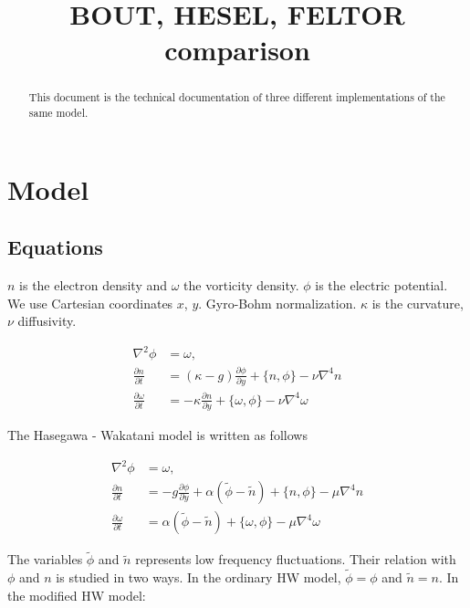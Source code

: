 \documentclass{hitec} %
\begin{document}
\title{BOUT, HESEL, FELTOR comparison}
\maketitle

\begin{abstract}
This document is the technical documentation of three different implementations of the same model.
\end{abstract}

\section{Model}
\subsection{Equations}
 $n$ is the electron density and $\omega$
the vorticity density. $\phi$ is the electric potential. We
use Cartesian coordinates $x$, $y$. Gyro-Bohm normalization. $\kappa$ is
the curvature, $\nu$ diffusivity.

\begin{subequations}
\begin{align}
 \nabla^2 \phi & =  \omega, \quad \\
 \frac{\partial n}{\partial t}    & =  (\kappa - g) \frac{\partial \phi}{\partial y} + \{ n, \phi\}
  - \nu \nabla^4 n  \\
  \frac{\partial \omega}{\partial t} & =
  - \kappa\frac{\partial n}{\partial y} + \{ \omega, \phi\} -\nu\nabla^4\omega
\end{align}
\end{subequations}

The Hasegawa - Wakatani model is written as follows

\begin{subequations}
\begin{align}
 \nabla^2 \phi & =  \omega, \quad \\
 \frac{\partial n}{\partial t}     & =  - g \frac{\partial \phi}{\partial y} + \alpha (\tilde{\phi} - \tilde{n})
 + \{n, \phi\} - \mu \nabla^4 n \\
  \frac{\partial \omega}{\partial t} & =  \alpha ( \tilde{\phi} - \tilde{n}) + \{ \omega, \phi\}
- \mu\nabla^4\omega
\end{align}
\end{subequations}

The variables $\tilde{\phi}$ and $\tilde{n}$ represents low frequency fluctuations. Their relation with $\phi$ and $n$ is studied in two ways. In the ordinary HW model, $\tilde{\phi} = \phi$ and $\tilde{n} = n$. In the modified HW model:
\end{document}
